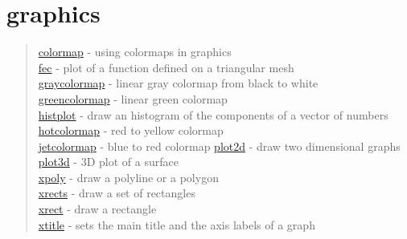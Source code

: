 \chapter*{graphics}

\begin{quote}
\noindent
\hyperlink{colormap}{colormap} - using colormaps in graphics\\
\hyperlink{fec}{fec} -  plot of a function defined on a triangular mesh\\
\hyperlink{graycolormap}{graycolormap} - linear gray colormap from black to white\\
\hyperlink{greencolormap}{greencolormap} - linear green colormap\\
\hyperlink{histplot}{histplot} - draw an histogram of the components of a vector of numbers\\
\hyperlink{hotcolormap}{hotcolormap} - red to yellow colormap\\
\hyperlink{jetcolormap}{jetcolormap} - blue to red colormap
\hyperlink{plot2d}{plot2d} - draw two dimensional graphs\\
\hyperlink{plot3d}{plot3d} - 3D plot of a surface \\
\hyperlink{xpoly}{xpoly} - draw a polyline or a polygon \\
\hyperlink{xrects}{xrects} - draw a set of rectangles\\
\hyperlink{xrect}{xrect} - draw a rectangle\\
\hyperlink{xtitle}{xtitle} - sets the main title and the axis labels of a graph\\
\end{quote}












